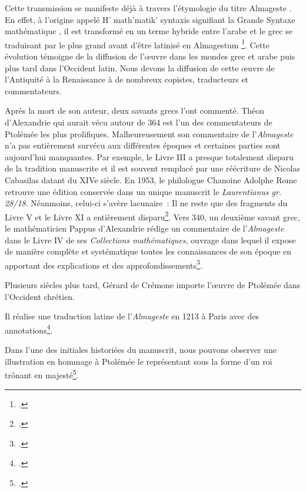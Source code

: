 Cette transmission se manifeste déjà à travers l'étymologie du titre \og Almageste \fg.
En effet, à l'origine appelé \og H' math'matik' syntaxis \fg signifiant la \og Grande Syntaxe mathématique \fg,
il est transformé en un terme hybride entre l'arabe et le grec se traduisant par \og le plus grand \fg avant d'être latinisé en \og Almagestum \fg\footcite{raymondjonesPtolemyAccomplishmentsBiography2025}.
Cette évolution témoigne de la diffusion de l'œuvre dans les mondes grec et arabe puis plus tard dans l'Occident latin.
Nous devons la diffusion de cette œuvre de l'Antiquité à la Renaissance à de nombreux copistes, traducteurs et commentateurs.

Après la mort de son auteur, deux savants grecs l'ont commenté.
Théon d'Alexandrie qui aurait vécu autour de 364 est l'un des commentateurs de Ptolémée les plus prolifiques.
Malheureusement son commentaire de l'\textit{Almageste} n'a pas entièrement survécu aux différentes époques et certaines parties sont aujourd'hui manquantes.
Par exemple, le Livre III a presque totalement disparu de la tradition manuscrite et il est souvent remplacé par une réécriture de Nicolas Cabasilas datant du XIVe siècle.
En 1953, le philologue Chanoine Adolphe Rome retrouve une édition conservée dans un unique manuscrit le \textit{Laurentianus gr. 28/18}.
Néanmoins, celui-ci s'avère lacunaire~: Il ne reste que des fragments du Livre V et le Livre XI a entièrement disparu\footcite{tihonLivreRetrouveCommentaire1987}.
Vers 340, un deuxième savant grec, le mathématicien Pappus d'Alexandrie rédige un commentaire de l'\textit{Almageste} dans le Livre IV de ses \textit{Collections mathématiques},
ouvrage dans lequel il expose de manière complète et systématique toutes les connaissances de son époque en apportant des explications et des approfondissements\footcite{meyerPAPPUS1999}.

Plusieurs siècles plus tard, Gérard de Crémone importe l'œuvre de Ptolémée dans l'Occident chrétien.

Il réalise une traduction latine de l'\textit{Almageste} en 1213 à Paris avec des annotations\footcite{ptolemaeusPtolomeusAlmagestumTransl1213}.

Dans l'une des initiales historiées du manuscrit, nous pouvons observer une illustration en hommage à Ptolémée le représentant sous la forme d'un roi trônant en majesté\footcite{TraductionLatineLAlmageste}.

